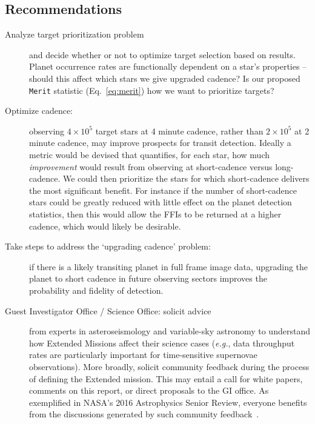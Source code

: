 \subsection{Recommendations}
\label{sec:recommendations}
\begin{description}
  
	\item[Analyze target prioritization problem] and decide whether or not to optimize target selection based on results. %
	Planet occurrence rates are functionally dependent on a star's properties -- should this affect which stars we give upgraded cadence?
	Is our proposed \texttt{Merit} statistic (Eq.~\ref{eq:merit}) how we want to prioritize targets?
	
      \item[Optimize cadence:] observing $4\times10^5$ target stars at 
	      4 minute cadence, rather than $2\times10^5$ at 2 minute cadence,
	      may improve prospects for transit detection. 
	      Ideally a metric would be devised that
        quantifies, for each star, how much {\it improvement} would
        result from observing at short-cadence versus long-cadence.
        We could then prioritize the stars for which short-cadence 
        delivers the most significant benefit. 
        For instance if the number of short-cadence stars could be 
        greatly reduced with little effect on the planet detection
        statistics, then this would allow the FFIs to be returned at a
        higher cadence, which would likely be desirable.
	
	\item[Take steps to address the `upgrading cadence' problem:]
          if there is a likely transiting planet in full frame image
          data, upgrading the planet to short cadence in future
          observing sectors improves the probability and fidelity of
          detection.
	
	\item[Guest Investigator Office / \tess Science Office:
          solicit advice] from experts in asteroseismology and
          variable-sky astronomy to understand how Extended Missions
          affect their science cases (\textit{e.g.}, data throughput
          rates are particularly important for time-sensitive
          supernovae observations).  More broadly, solicit community
          feedback during the process of defining the Extended
          mission.  This may entail a call for white papers, comments
          on this report, or direct proposals to the GI office.  As
          exemplified in NASA’s 2016 Astrophysics Senior Review,
          everyone benefits from the discussions generated by such
          community feedback~\citep{donahue_senior_2016}.
	

\end{description}
